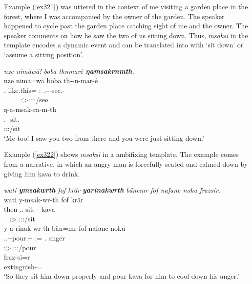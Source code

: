 Example (\ref{ex321}) was uttered in the context of me visiting a garden place in the forest, where I was accompanied by the owner of the garden. The speaker happened to cycle past the garden place catching sight of me and the owner. The speaker comments on how he saw the two of us sitting down. Thus, \emph{msaksi} in the  template encodes a dynamic event and can be translated into  with `sit down' or `assume a sitting position'.

\begin{exe}
	\ex \emph{nze nimäwä! boba thnmaré \textbf{ŋamsakrnmth}.}\\
	\glll nze nima=wä boba th-\Zero{}-n-mar-é\\
	\Fsg.\Erg{} like.this=\Emph{} \Med:\Abl{} \Stnsg.\Gam-\Du-\Venit-see.\Rs-\Fsg{}\\
	~ ~ ~ {\Fsg:\Sbj>\Stdu:\Obj:\Rpst:\Pfv:\Venit/see}\\
	\sn
	\glll ŋ-a-msak-rn-m-th\\
	\M.\Alph-\Vc-sit.\Ext-\Du-\Dur-\Stnsg{}\\
	\footnotesize{\Stdu:\Sbj:\Rpst:\Dur/sit}\\
	\trans `Me too! I saw you two from there and you were just sitting down.'\\ 
	\label{ex321}
\end{exe}

Example (\ref{ex322}) shows \emph{msaksi} in a  ambifixing template. The example comes from a narrative, in which an angry man is forcefully seated and calmed down by giving him kava to drink.

\begin{exe}
	\ex \emph{wati \textbf{ymsakwrth} fof krär \textbf{yarinakwrth} bänemr fof nafane noku frazsir.}\\
	\glll wati y-msak-wr-th fof krär\\
	then \Tsg.\Masc.\Alph-sit.\Ext-\Ndu-\Stnsg{} \Emph{} kava\\
	~ {\Stpl:\Sbj>\Tsg.\Masc:\Obj:\Nonpast:\Ipfv/sit} ~ ~\\
	\sn
	\glll y-a-rinak-wr-th bän=mr fof nafane noku\\
	\Tsg.\Masc.\Alph-\Vc-pour.\Ext-\Ndu-\Stnsg{} \Dem:\Med=\Purp{} \Emph{} \Tsg.\Poss{} anger\\
	\footnotesize{\Stpl:\Sbj>\Tsg.\Masc:\Io:\Nonpast:\Ipfv/pour} ~ ~ ~\\
	\sn
	\gll fraz-si=r\\
	extinguish-\Nmlz=\Purp{}\\
	\trans `So they sit him down properly and pour kava for him to cool down his anger.' 
	\label{ex322}
\end{exe}

